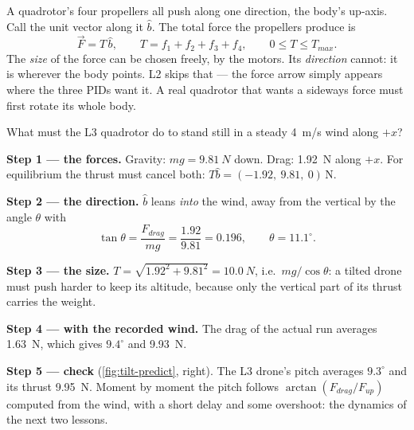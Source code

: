 A quadrotor's four propellers all push along one direction, the body's up-axis. Call the unit vector along it $\hat b$. The total force the propellers produce is
\begin{equation}\label{eq:tilt-thrust}
  \vec F = T\,\hat b ,\qquad T = f_1 + f_2 + f_3 + f_4, \qquad 0 \le T \le T_{max} .
\end{equation}
The \emph{size} of the force can be chosen freely, by the motors. Its \emph{direction} cannot: it is wherever the body points. L2 skips that — the force arrow simply appears where the three PIDs want it. A real quadrotor that wants a sideways force must first rotate its whole body.

\begin{example}
\label{ex:tilt-wind}
What must the L3 quadrotor do to stand still in a steady \SI{4}{m/s} wind along $+x$?

\textbf{Step 1 — the forces.} Gravity: $mg = \SI{9.81}{N}$ down. Drag: \SI{1.92}{N} along $+x$. For equilibrium the thrust must cancel both: $T\hat b = (-1.92,\ 9.81,\ 0)$\,N.

\textbf{Step 2 — the direction.} $\hat b$ leans \emph{into} the wind, away from the vertical by the angle $\theta$ with
\begin{equation}\label{eq:tilt-angle}
  \tan\theta = \frac{F_{drag}}{mg} = \frac{1.92}{9.81} = 0.196, \qquad \theta = 11.1^\circ .
\end{equation}

\textbf{Step 3 — the size.} $T = \sqrt{1.92^2 + 9.81^2} = \SI{10.0}{N}$, i.e.\ $mg/\cos\theta$: a tilted drone must push harder to keep its altitude, because only the vertical part of its thrust carries the weight.

\textbf{Step 4 — with the recorded wind.} The drag of the actual run averages \SI{1.63}{N}, which gives $9.4^\circ$ and \SI{9.93}{N}.

\textbf{Step 5 — check} (\cref{fig:tilt-predict}, right). The L3 drone's pitch averages $9.3^\circ$ and its thrust \SI{9.95}{N}. Moment by moment the pitch follows $\arctan(F_{drag}/F_{up})$ computed from the wind, with a short delay and some overshoot: the dynamics of the next two lessons.
\end{example}

